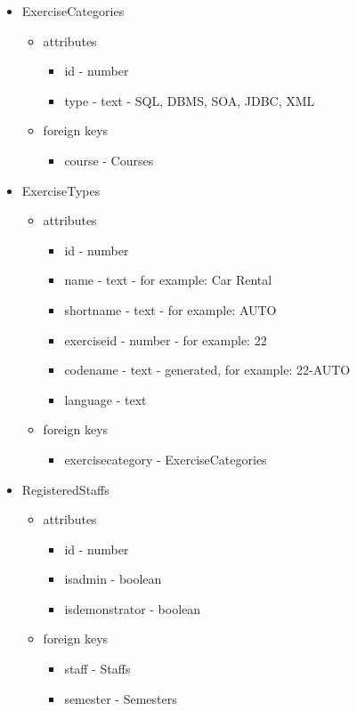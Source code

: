 \begin{itemize}
	\item ExerciseCategories
	\begin{itemize}
		\item attributes
		\begin{itemize}
			\item id - number
			\item type - text - SQL, DBMS, SOA, JDBC, XML
		\end{itemize}
		\item foreign keys
		\begin{itemize}
			\item course - Courses
		\end{itemize}
	\end{itemize}
	
	\item ExerciseTypes
	\begin{itemize}
		\item attributes
		\begin{itemize}
			\item id - number
			\item name - text - for example: Car Rental
			\item shortname - text - for example: AUTO
			\item exerciseid - number - for example: 22
			\item codename - text - generated, for example: 22-AUTO
			\item language - text
		\end{itemize}
		\item foreign keys
		\begin{itemize}
			\item exercisecategory - ExerciseCategories
		\end{itemize}
	\end{itemize}
	
	\item RegisteredStaffs
	\begin{itemize}
		\item attributes
		\begin{itemize}
			\item id - number
			\item isadmin - boolean
			\item isdemonstrator - boolean
		\end{itemize}
		\item foreign keys
		\begin{itemize}
			\item staff - Staffs
			\item semester - Semesters
		\end{itemize}
	\end{itemize}
	

\end{itemize}
